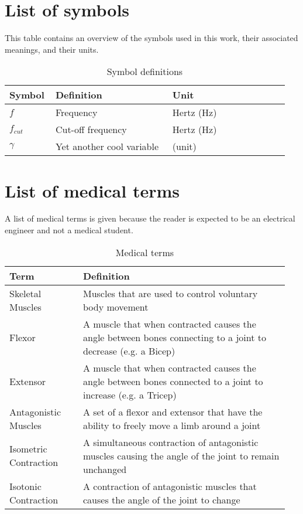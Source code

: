 \section{List of symbols}
This table contains an overview of the symbols used in this work, their associated meanings, and their units.

\begin{table}[H]
    \centering
    \begin{tabular}{p{0.15\linewidth} | p{0.4\linewidth} | p{0.4\linewidth}}
    Symbol & Definition & Unit \\ \hline
    $f$ & Frequency & Hertz (Hz) \\ 
    $f_{cut}$ & Cut-off frequency & Hertz (Hz) \\
    $\gamma$ & Yet another cool variable & (unit)
    \end{tabular}
    \caption{Symbol definitions}
    \label{tab:symbol_definitions}
\end{table}

\section{List of medical terms}
A list of medical terms is given because the reader is expected to be an electrical engineer and not a medical student.
\begin{table}[H]
    \centering
    \begin{tabular}{p{0.25\linewidth} | p{0.7\linewidth}}
    Term & Definition \\ \hline
    Skeletal Muscles & Muscles that are used to control voluntary body movement \\
    Flexor & A muscle that when contracted causes the angle between bones connecting to a joint to decrease (e.g. a Bicep) \\
    Extensor & A muscle that when contracted causes the angle between bones connected to a joint to increase (e.g. a Tricep) \\
    Antagonistic Muscles & A set of a flexor and extensor that have the ability to freely move a limb around a joint \\ 
    Isometric Contraction & A simultaneous contraction of antagonistic muscles causing the angle of the joint to remain unchanged \\
    Isotonic Contraction & A contraction of antagonistic muscles that causes the angle of the joint to change \\
    \end{tabular}
    \caption{Medical terms}
    \label{tab:medical_definitions}
\end{table}
